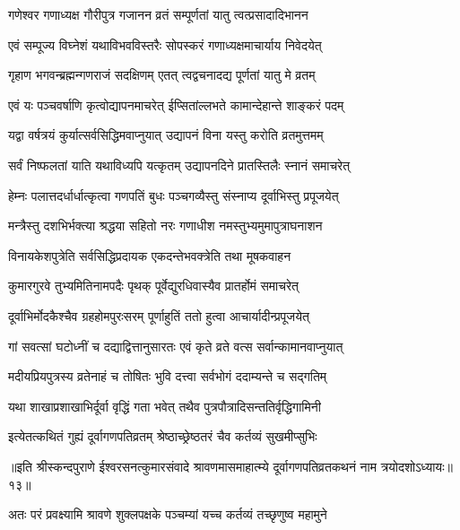 \twolineshloka
{गणेश्वर गणाध्यक्ष गौरीपुत्र गजानन}
{व्रतं सम्पूर्णतां यातु त्वत्प्रसादादिभानन} %

\twolineshloka
{एवं सम्पूज्य विघ्नेशं यथाविभवविस्तरैः}
{सोपस्करं गणाध्यक्षमाचार्याय निवेदयेत्} %

\twolineshloka
{गृहाण भगवन्ब्रह्मन्गणराजं सदक्षिणम्}
{एतत् त्वद्वचनादद्य पूर्णतां यातु मे व्रतम्} %

\twolineshloka
{एवं यः पञ्चवर्षाणि कृत्वोद्यापनमाचरेत्}
{ईप्सितांल्लभते कामान्देहान्ते शाङ्करं पदम्} %

\twolineshloka
{यद्वा वर्षत्रयं कुर्यात्सर्वसिद्धिमवाप्नुयात्}
{उद्यापनं विना यस्तु करोति व्रतमुत्तमम्} %

\twolineshloka
{सर्वं निष्फलतां याति यथाविध्यपि यत्कृतम्}
{उद्यापनदिने प्रातस्तिलैः स्नानं समाचरेत्} %

\twolineshloka
{हेम्नः पलात्तदर्धार्धात्कृत्वा गणपतिं बुधः}
{पञ्चगव्यैस्तु संस्नाप्य दूर्वाभिस्तु प्रपूजयेत्} %

\twolineshloka
{मन्त्रैस्तु दशभिर्भक्त्या श्रद्धया सहितो नरः}
{गणाधीश नमस्तुभ्यमुमापुत्राघनाशन} %

\twolineshloka
{विनायकेशपुत्रेति सर्वसिद्धिप्रदायक}
{एकदन्तेभवक्त्रेति तथा मूषकवाहन} %

\twolineshloka
{कुमारगुरवे तुभ्यमितिनामपदैः पृथक्}
{पूर्वेद्युरधिवास्यैव प्रातर्होमं समाचरेत्} %

\twolineshloka
{दूर्वाभिर्मोदकैश्चैव ग्रहहोमपुरःसरम्}
{पूर्णाहुतिं ततो हुत्वा आचार्यादीन्प्रपूजयेत्} %

\twolineshloka
{गां सवत्सां घटोध्नीं च दद्याद्वित्तानुसारतः}
{एवं कृते व्रते वत्स सर्वान्कामानवाप्नुयात्} %

\twolineshloka
{मदीयप्रियपुत्रस्य व्रतेनाहं च तोषितः}
{भुवि दत्त्वा सर्वभोगं ददाम्यन्ते च सद्गतिम्} %

\twolineshloka
{यथा शाखाप्रशाखाभिर्दूर्वा वृद्धिं गता भवेत्}
{तथैव पुत्रपौत्रादिसन्ततिर्वृद्धिगामिनी} %

\twolineshloka
{इत्येतत्कथितं गुह्यं दूर्वागणपतिव्रतम्}
{श्रेष्ठाच्छ्रेष्ठतरं चैव कर्तव्यं सुखमीप्सुभिः} %


{॥इति श्रीस्कन्दपुराणे ईश्वरसनत्कुमारसंवादे श्रावणमासमाहात्म्ये दूर्वागणपतिव्रतकथनं नाम त्रयोदशोऽध्यायः॥१३॥}





\twolineshloka
{अतः परं प्रवक्ष्यामि श्रावणे शुक्लपक्षके}
{पञ्चम्यां यच्च कर्तव्यं तच्छृणुष्व महामुने} %

